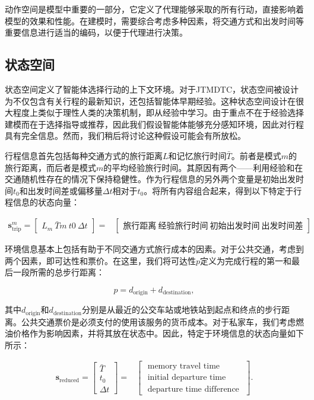 动作空间是模型中重要的一部分，它定义了代理能够采取的所有行动，直接影响着模型的效果和性能。在建模时，需要综合考虑多种因素，将交通方式和出发时间等重要信息进行适当的编码，以便于代理进行决策。
\subsection{状态空间}

状态空间定义了智能体选择行动的上下文环境。对于JTMDTC，状态空间被设计为不仅包含有关行程的最新知识，还包括智能体早期经验。这种状态空间设计在很大程度上类似于理性人类的决策机制，即从经验中学习。由于重点不在于经验选择建模而在于选择指导或推荐，因此我们假设智能体能够充分感知环境，因此对行程具有完全信息。然而，我们稍后将讨论这种假设可能会有所放松。

行程信息首先包括每种交通方式的旅行距离$L$和记忆旅行时间$\bar{T}$。前者是模式$m$的旅行距离，而后者是模式$m$的平均经验旅行时间。其原因有两个——利用经验和在交通随机性存在的情况下保持稳健性。作为行程信息的另外两个变量是初始出发时间$t_0$和出发时间差或偏移量$\Delta t$相对于$t_0$。将所有内容组合起来，得到以下特定于行程信息的状态向量：


\begin{equation}
\begin{aligned}
{\bm{s}_\text{trip}^m}=\left[\begin{array}{c}
L_m \
{\bar{T}}m \
t{0} \
\Delta t
\end{array}\right]=&\left[\begin{array}{c}
\text{旅行距离}\
\text{经验旅行时间}\
\text{初始出发时间}\
\text{出发时间差}
\end{array}\right].
\end{aligned}\label{equation:trip}
\end{equation}

环境信息基本上包括有助于不同交通方式旅行成本的因素。对于公共交通，考虑到两个因素，即可达性和票价。在这里，我们将可达性$p$定义为完成行程的第一和最后一段所需的总步行距离：

\begin{equation}
p=d_{\text{origin}}+d_{\text{destination}},
\end{equation}

其中$d_{\text{origin}}$和$d_{\text{destination}}$分别是从最近的公交车站或地铁站到起点和终点的步行距离。公共交通票价是必须支付的使用该服务的货币成本。对于私家车，我们考虑燃油价格作为影响因素，并将其放在状态中。因此，特定于环境信息的状态向量如下所示：

\begin{equation}
\begin{aligned}
\bm{s}_\text{reduced}=\left[\begin{array}{c}
\bar{T} \\
t_{0} \\
\Delta t
\end{array}\right]=&\left[\begin{array}{c}
\text { memory travel time } \\
\text { initial departure time } \\
\text { departure time difference }
\end{array}\right].
\end{aligned}\label{equation:obs}
\end{equation}

